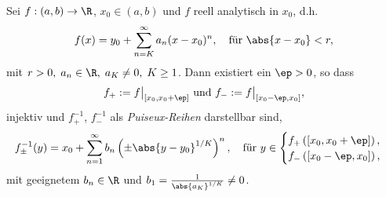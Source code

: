 \begin{prop}
\label{prop:2.64}
Sei $f:(a,b)\to\R$, $x_0\in(a,b)$ und $f$ reell analytisch in $x_0$, d.h.
\begin{align*}
f(x) = y_0+\sum\limits_{n=K}^\infty a_n(x-x_0)^n,\quad\text{für } \abs{x-x_0}<r,
\end{align*}
mit $r>0,\;a_n\in\R,\;a_K\neq 0,\;K\ge 1$. Dann existiert ein $\ep>0$, so dass
\begin{align*}
f_+ := f\big|_{\left[x_0,x_0+\ep \right]}\text{ und }
f_- := f\big|_{\left[x_0-\ep,x_0 \right]},
\end{align*}
injektiv und $f_+^{-1}$, $f_-^{-1}$ als \emph{Puiseux-Reihen}
darstellbar sind,
\begin{align*}
f_{\pm}^{-1}(y) = x_0 + \sum\limits_{n=1}^\infty b_n
\left(\pm\abs{y-y_0}^{1/K}\right)^n,\quad\text{für }
y\in\begin{cases}
    f_+\left(\left[x_0,x_0+\ep\right] \right),\\
    f_-\left(\left[x_0-\ep,x_0\right] \right),
    \end{cases}
\end{align*}
mit geeignetem $b_n\in\R$ und $b_1 = \frac{1}{\abs{a_K}^{1/K}}\neq0$.\fishhere
\end{prop}
